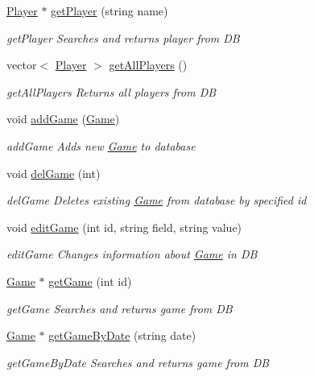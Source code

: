 \begin{DoxyCompactItemize}
\hyperlink{class_player}{Player} $\ast$ \hyperlink{class_data_base_ac96812e42a636dbed6f67e1dd5929583}{get\-Player} (string name)
\begin{DoxyCompactList}\small\item\em get\-Player Searches and returns player from D\-B \end{DoxyCompactList}\item 
vector$<$ \hyperlink{class_player}{Player} $>$ \hyperlink{class_data_base_a75ff20bfd5026b449a100eb921d4782f}{get\-All\-Players} ()
\begin{DoxyCompactList}\small\item\em get\-All\-Players Returns all players from D\-B \end{DoxyCompactList}\item 
void \hyperlink{class_data_base_a9ec33a7d1b80f0a2ac1ea4bc1cae0250}{add\-Game} (\hyperlink{class_game}{Game})
\begin{DoxyCompactList}\small\item\em add\-Game Adds new \hyperlink{class_game}{Game} to database \end{DoxyCompactList}\item 
void \hyperlink{class_data_base_ab8c99e8127da0e91f9c781df34354e95}{del\-Game} (int)
\begin{DoxyCompactList}\small\item\em del\-Game Deletes existing \hyperlink{class_game}{Game} from database by specified id \end{DoxyCompactList}\item 
void \hyperlink{class_data_base_a34bfc02d1b00880b4e0e8649a72ced65}{edit\-Game} (int id, string field, string value)
\begin{DoxyCompactList}\small\item\em edit\-Game Changes information about \hyperlink{class_game}{Game} in D\-B \end{DoxyCompactList}\item 
\hyperlink{class_game}{Game} $\ast$ \hyperlink{class_data_base_aa8d315a9be22cdb1307bdcc9b7a2f582}{get\-Game} (int id)
\begin{DoxyCompactList}\small\item\em get\-Game Searches and returns game from D\-B \end{DoxyCompactList}\item 
\hyperlink{class_game}{Game} $\ast$ \hyperlink{class_data_base_ad2a82229b013ff5a9c8c601c1dc31644}{get\-Game\-By\-Date} (string date)
\begin{DoxyCompactList}\small\item\em get\-Game\-By\-Date Searches and returns game from D\-B \end{DoxyCompactList}\item 

\end{DoxyCompactItemize}
